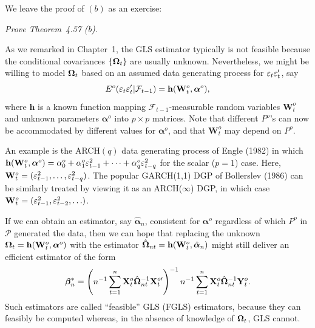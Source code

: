 We leave the proof of $(b)$ as an exercise:

\begin{exercises}
\item\label{ex:4.58} \textit{Prove Theorem~4.57 (b).}
\end{exercises}

As we remarked in Chapter~1, the GLS estimator typically is not feasible
because the conditional covariances $\{\boldsymbol{\Omega}_t\}$ are usually unknown. Nevertheless, we might be willing to model $\boldsymbol{\Omega}_t$ based on an assumed data generating
process for $\varepsilon_t\varepsilon_t'$, say
\[
E^o(\varepsilon_t\varepsilon_t'|\mathcal{F}_{t-1}) = \mathbf{h}(\mathbf{W}_t^o, \boldsymbol{\alpha}^o),
\]
where $\mathbf{h}$ is a known function mapping $\mathcal{F}_{t-1}$-measurable random variables
$\mathbf{W}_t^o$ and unknown parameters $\boldsymbol{\alpha}^o$ into $p \times p$ matrices. Note that different
$P^o$'s can now be accommodated by different values for $\boldsymbol{\alpha}^o$, and that $\mathbf{W}_t^o$
may depend on $P^o$.

An example is the ARCH$(q)$ data generating process of Engle (1982) in
which $\mathbf{h}(\mathbf{W}_t^o, \boldsymbol{\alpha}^o) = \alpha_0^o + \alpha_1^o\varepsilon_{t-1}^2 + \cdots + \alpha_q^o\varepsilon_{t-q}^2$ for the scalar ($p=1$) case.
Here, $\mathbf{W}_t^o = (\varepsilon_{t-1}^2, \ldots, \varepsilon_{t-q}^2)$. The popular GARCH(1,1) DGP of Bollerslev
(1986) can be similarly treated by viewing it as an ARCH($\infty$) DGP, in
which case $\mathbf{W}_t^o = (\varepsilon_{t-1}^2, \varepsilon_{t-2}^2, \ldots)$.

If we can obtain an estimator, say $\hat{\boldsymbol{\alpha}}_n$, consistent for $\boldsymbol{\alpha}^o$ regardless of
which $P^o$ in $\mathcal{P}$ generated the data, then we can hope that replacing the
unknown $\boldsymbol{\Omega}_t = \mathbf{h}(\mathbf{W}_t^o, \boldsymbol{\alpha}^o)$ with the estimator $\hat{\boldsymbol{\Omega}}_{nt} = \mathbf{h}(\mathbf{W}_t^o, \hat{\boldsymbol{\alpha}}_n)$ might
still deliver an efficient estimator of the form
\[
\boldsymbol{\beta}_n^* = \left(n^{-1}\sum_{t=1}^{n}\mathbf{X}_t^o\hat{\boldsymbol{\Omega}}_{nt}^{-1}\mathbf{X}_t^{o\prime}\right)^{-1}n^{-1}\sum_{t=1}^{n}\mathbf{X}_t^o\hat{\boldsymbol{\Omega}}_{nt}^{-1}\mathbf{Y}_t^o.
\]
Such estimators are called ``feasible'' GLS (FGLS) estimators, because they
can feasibly be computed whereas, in the absence of knowledge of $\boldsymbol{\Omega}_t$, GLS
cannot.

